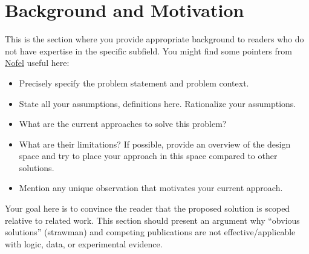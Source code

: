 \section{Background and Motivation}
\label{sec:background}

This is the section where you provide appropriate background to readers who do not have expertise in the specific subfield. You might find some pointers from \href{https://www.seas.upenn.edu/~nyaseen/PaperWriting2.pdf}{Nofel} useful here: 
\begin{itemize}
    \item Precisely specify the problem statement and problem context. 
    \item State all your assumptions, definitions here. Rationalize your assumptions. 
    \item What are the current approaches to solve this problem? 
    \item What are their limitations? If possible, provide an overview of the design space and try to place your approach in this space compared to other solutions. 
    \item Mention any unique observation that motivates your current approach. 
\end{itemize}

Your goal here is to convince the reader that the proposed solution is scoped relative to related work. This section should present an argument why “obvious solutions” (strawman) and competing publications are not effective/applicable with logic, data, or experimental evidence.